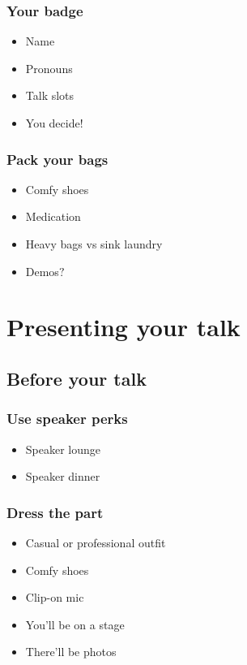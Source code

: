 \documentclass{beamer}
\begin{document}
\begin{frame}[fragile]
\frametitle{Your badge}
\begin{itemize}[<+(1)->]
\item Name
\item Pronouns
\item Talk slots
\item You decide!
\end{itemize}
\end{frame}

\begin{frame}[fragile]
\frametitle{Pack your bags}
\begin{itemize}[<+(1)->]
\item Comfy shoes
\item Medication
\item Heavy bags vs sink laundry
\item Demos$?$
\end{itemize}
\end{frame}

\section{Presenting your talk}

\begin{frame}[fragile]
\tableofcontents[currentsection]
\end{frame}


\subsection{Before your talk}

\begin{frame}[fragile]
\frametitle{Use speaker perks}
\begin{itemize}[<+(1)->]
\item Speaker lounge
\item Speaker dinner
\end{itemize}
\end{frame}

\begin{frame}[fragile]
\frametitle{Dress the part}
\begin{itemize}[<+(1)->]
\item Casual or professional outfit
\item Comfy shoes
\item Clip-on mic
\item You'll be on a stage
\item There'll be photos
\end{itemize}
\end{frame}
\end{document}
